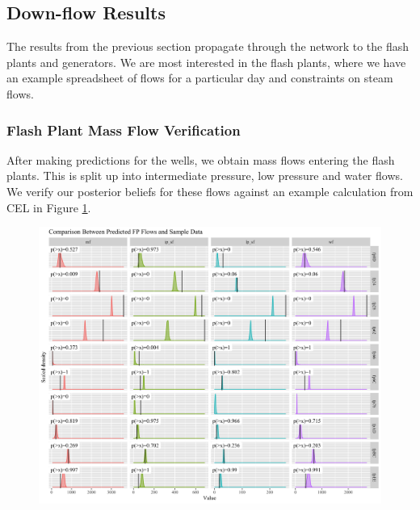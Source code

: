 \documentclass[a4paper, 12pt]{article}
\begin{document}

\subsection{Down-flow Results} \label{sec:downflow}
The results from the previous section propagate through the network to the flash plants and generators. We are most interested in the flash plants, where we have an example spreadsheet of flows for a particular day and constraints on steam flows.

\subsubsection{Flash Plant Mass Flow Verification}

After making predictions for the wells, we obtain mass flows entering the flash plants. This is split up into intermediate pressure, low pressure and water flows. We verify our posterior beliefs for these flows against an example calculation from CEL in Figure \ref{fig:verification}. 

\begin{figure}
  \centering
  \includegraphics[width=\linewidth]{media/verification}
  \label{fig:verification}
\end{figure}
\end{document}

